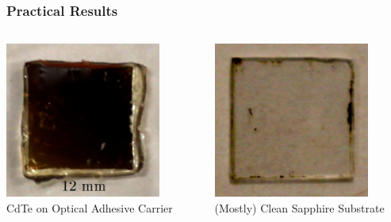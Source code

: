 \documentclass[]{beamer}%
\begin{document}
\begin{frame}
    \frametitle{Practical Results}
    \begin{columns}
        \begin{column}{0.5\textwidth}
            \centering
            \includegraphics[width=0.8\textwidth]{graphics/cdteliftoff_liftoff} \\
            CdTe on Optical Adhesive Carrier
        \end{column}
        \begin{column}{0.5\textwidth}
            \centering
            \includegraphics[width=0.8\textwidth]{graphics/cdteliftoff_sapphire} \\
            (Mostly) Clean Sapphire Substrate
        \end{column}
    \end{columns}
\end{frame}
\end{document}
